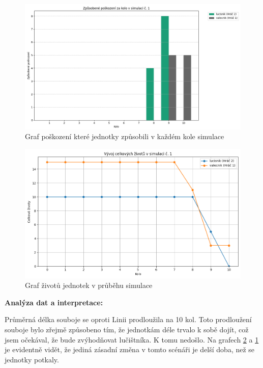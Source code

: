 \begin{figure}
  \centering      %
  \includegraphics[scale=0.5]{obr/graf_valVSluc_flat_damage.png} %
  \caption{Graf poškození které jednotky způsobili v každém kole simulace} %
  \label{graf_valVSluc_flat_damage} %
\end{figure}

\begin{figure}
  \centering      %
  \includegraphics[scale=0.5]{obr/graf_valVSluc_flat_HP.png} %
  \caption{Graf životů jednotek v průběhu simulace} %
  \label{graf_valVSluc_flat_HP} %
\end{figure}

\textbf{Analýza dat a interpretace:}

Průměrná délka souboje se oproti Linii prodloužila na 10 kol. Toto prodloužení souboje bylo zřejmě způsobeno tím, že jednotkám déle trvalo k sobě dojít, což jsem očekával, že bude zvýhodňovat lučištníka. K tomu nedošlo. Na grafech \ref{graf_valVSluc_flat_HP} a \ref{graf_valVSluc_flat_damage} je evidentně vidět, že jediná zásadní změna v tomto scénáři je delší doba, než se jednotky potkaly.

